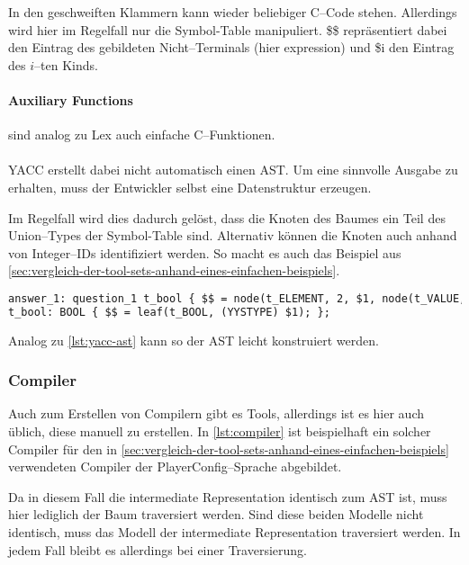 In den geschweiften Klammern kann wieder beliebiger C--Code stehen.
Allerdings wird hier im Regelfall nur die Symbol-Table manipuliert.
{\ttfamily \$\$} repräsentiert dabei den Eintrag des gebildeten Nicht--Terminals (hier {\ttfamily expression}) und {\ttfamily \$i} den Eintrag des $i$--ten Kinds.

\paragraph{Auxiliary Functions} sind analog zu Lex auch einfache C--Funktionen.

\paragraph*{}
\ac{YACC} erstellt dabei nicht automatisch einen \ac{AST}.
Um eine sinnvolle Ausgabe zu erhalten, muss der Entwickler selbst eine Datenstruktur erzeugen.

Im Regelfall wird dies dadurch gelöst, dass die Knoten des Baumes ein Teil des Union--Types der Symbol-Table sind.
Alternativ können die Knoten auch anhand von Integer--IDs identifiziert werden.
So macht es auch das Beispiel aus \autoref{sec:vergleich-der-tool-sets-anhand-eines-einfachen-beispiels}.
\begin{lstlisting}[label={lst:yacc-ast},caption={\acs{YACC} \acs{AST}},language=yacc]
answer_1: question_1 t_bool { $$ = node(t_ELEMENT, 2, $1, node(t_VALUE, 1, $2)); };
t_bool: BOOL { $$ = leaf(t_BOOL, (YYSTYPE) $1); };
\end{lstlisting}
Analog zu \autoref{lst:yacc-ast} kann so der \ac{AST} leicht konstruiert werden.

\subsubsection{Compiler}
Auch zum Erstellen von Compilern gibt es Tools, allerdings ist es hier auch üblich, diese manuell zu erstellen.
In \autoref{lst:compiler} ist beispielhaft ein solcher Compiler für den in \autoref{sec:vergleich-der-tool-sets-anhand-eines-einfachen-beispiels} verwendeten Compiler der PlayerConfig--Sprache abgebildet.

Da in diesem Fall die intermediate Representation identisch zum \ac{AST} ist, muss hier lediglich der Baum traversiert werden.
Sind diese beiden Modelle nicht identisch, muss das Modell der intermediate Representation traversiert werden.
In jedem Fall bleibt es allerdings bei einer Traversierung.

